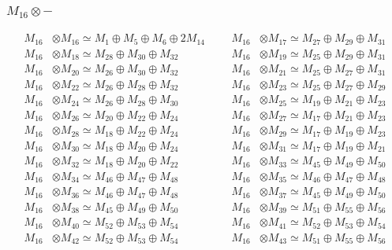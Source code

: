 \subsubsection{$ M_{16}\otimes -$}
\begin{align*}
M_{16} &\otimes M_{16} \simeq M_{1} \oplus M_{5} \oplus M_{6} \oplus 2M_{14} &&& M_{16} &\otimes M_{17} \simeq M_{27} \oplus M_{29} \oplus M_{31}\\
M_{16} &\otimes M_{18} \simeq M_{28} \oplus M_{30} \oplus M_{32} &&& M_{16} &\otimes M_{19} \simeq M_{25} \oplus M_{29} \oplus M_{31}\\
M_{16} &\otimes M_{20} \simeq M_{26} \oplus M_{30} \oplus M_{32} &&& M_{16} &\otimes M_{21} \simeq M_{25} \oplus M_{27} \oplus M_{31}\\
M_{16} &\otimes M_{22} \simeq M_{26} \oplus M_{28} \oplus M_{32} &&& M_{16} &\otimes M_{23} \simeq M_{25} \oplus M_{27} \oplus M_{29}\\
M_{16} &\otimes M_{24} \simeq M_{26} \oplus M_{28} \oplus M_{30} &&& M_{16} &\otimes M_{25} \simeq M_{19} \oplus M_{21} \oplus M_{23}\\
M_{16} &\otimes M_{26} \simeq M_{20} \oplus M_{22} \oplus M_{24} &&& M_{16} &\otimes M_{27} \simeq M_{17} \oplus M_{21} \oplus M_{23}\\
M_{16} &\otimes M_{28} \simeq M_{18} \oplus M_{22} \oplus M_{24} &&& M_{16} &\otimes M_{29} \simeq M_{17} \oplus M_{19} \oplus M_{23}\\
M_{16} &\otimes M_{30} \simeq M_{18} \oplus M_{20} \oplus M_{24} &&& M_{16} &\otimes M_{31} \simeq M_{17} \oplus M_{19} \oplus M_{21}\\
M_{16} &\otimes M_{32} \simeq M_{18} \oplus M_{20} \oplus M_{22} &&& M_{16} &\otimes M_{33} \simeq M_{45} \oplus M_{49} \oplus M_{50}\\
M_{16} &\otimes M_{34} \simeq M_{46} \oplus M_{47} \oplus M_{48} &&& M_{16} &\otimes M_{35} \simeq M_{46} \oplus M_{47} \oplus M_{48}\\
M_{16} &\otimes M_{36} \simeq M_{46} \oplus M_{47} \oplus M_{48} &&& M_{16} &\otimes M_{37} \simeq M_{45} \oplus M_{49} \oplus M_{50}\\
M_{16} &\otimes M_{38} \simeq M_{45} \oplus M_{49} \oplus M_{50} &&& M_{16} &\otimes M_{39} \simeq M_{51} \oplus M_{55} \oplus M_{56}\\
M_{16} &\otimes M_{40} \simeq M_{52} \oplus M_{53} \oplus M_{54} &&& M_{16} &\otimes M_{41} \simeq M_{52} \oplus M_{53} \oplus M_{54}\\
M_{16} &\otimes M_{42} \simeq M_{52} \oplus M_{53} \oplus M_{54} &&& M_{16} &\otimes M_{43} \simeq M_{51} \oplus M_{55} \oplus M_{56}\\

\end{align*}

